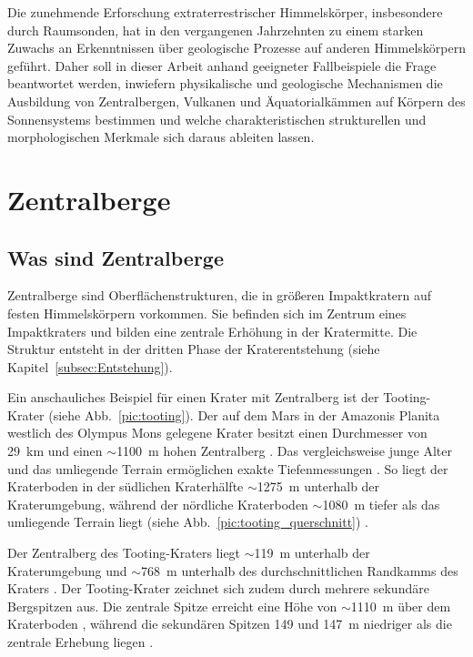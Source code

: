 \documentclass[a4paper,11pt]{article}
\newcommand{\mysection}[1]{\section{#1}\label{sec:#1}}
\newcommand{\mysubsection}[1]{\subsection{#1}\label{subsec:#1}}
\begin{document}
Die zunehmende Erforschung extraterrestrischer Himmelskörper, insbesondere durch Raumsonden, hat in den
vergangenen Jahrzehnten zu einem starken Zuwachs an Erkenntnissen über geologische Prozesse auf anderen
Himmelskörpern geführt.
Daher soll in dieser Arbeit anhand geeigneter Fallbeispiele die Frage beantwortet werden,
inwiefern physikalische und geologische Mechanismen die Ausbildung von
Zentralbergen, Vulkanen und Äquatorialkämmen auf Körpern des Sonnensystems bestimmen
und welche charakteristischen strukturellen und morphologischen Merkmale sich daraus ableiten lassen.








\mysection{Zentralberge}
\mysubsection{Was sind Zentralberge}

Zentralberge sind Oberflächenstrukturen, die in größeren Impaktkratern auf festen Himmelskörpern vorkommen.
Sie befinden sich im Zentrum eines Impaktkraters und bilden eine zentrale Erhöhung in der Kratermitte.
Die Struktur entsteht in der dritten Phase der Kraterentstehung (siehe Kapitel~\ref{subsec:Entstehung}).

Ein anschauliches Beispiel für einen Krater mit Zentralberg ist der Tooting-Krater (siehe Abb.~\ref{pic:tooting}).
Der auf dem Mars in der Amazonis Planita westlich des Olympus Mons gelegene Krater besitzt einen Durchmesser von 29~km und
einen $\sim$1100~m hohen Zentralberg \parencite[1615, 1616, 1619]{Mouginis-Mark_2007}.
Das vergleichsweise junge Alter und das umliegende Terrain
ermöglichen exakte Tiefenmessungen \parencite[1616]{Mouginis-Mark_2007}.
So liegt der Kraterboden in der südlichen Kraterhälfte $\sim$1275~m unterhalb der Kraterumgebung, während
der nördliche Kraterboden $\sim$1080~m tiefer als das umliegende Terrain liegt
(siehe Abb.~\ref{pic:tooting_querschnitt}) \parencite[1]{Mouginis-Mark_2015}.

Der Zentralberg des Tooting-Kraters liegt $\sim$119~m unterhalb der Kraterumgebung und
$\sim$768~m unterhalb des durchschnittlichen Randkamms des Kraters \parencite[1]{Mouginis-Mark_2015}.
Der Tooting-Krater zeichnet sich zudem durch mehrere sekundäre Bergspitzen aus.
Die zentrale Spitze erreicht eine Höhe von $\sim$1110~m über dem Kraterboden \parencite[1]{Mouginis-Mark_2015},
während die sekundären Spitzen 149 und 147~m niedriger als die zentrale Erhebung liegen \parencite[1619]{Mouginis-Mark_2007}.
\end{document}
